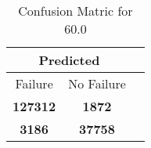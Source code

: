 \begin{table}[] 
\caption{Confusion Matric for 60.0} 
\label{Table: Prediction Accuracy-DMD60.0OnlySunEKF-resetReflectionEKF-top2perfectNoFailurePrediction-Reflection} 
\centering 
\begin{tabular} 
 {@{}ccc@{}} 
\toprule 
\multicolumn{2}{c}{\textbf{Predicted}}
 \\ \midrule 
\multicolumn{1}{|c|}{Failure} & 
\multicolumn{1}{c|}{No Failure}
 \\ \midrule 
\multicolumn{1}{|c|}{\color{green}\textbf{127312}} & 
\multicolumn{1}{c|}{\color{red}\textbf{1872}}
 \\ \midrule 
\multicolumn{1}{|c|}{\color{red}\textbf{3186}} & 
\multicolumn{1}{c|}{\color{green}\textbf{37758}}
 \\ \bottomrule 
\end{tabular} 
\end{table} 
